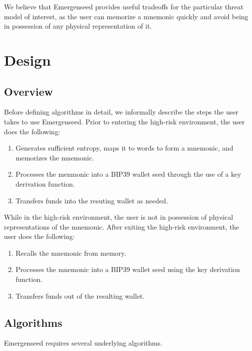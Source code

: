 \documentclass{article}
\begin{document}
We believe that Emergenseed provides useful tradeoffs for the particular threat model of interest, as the user can memorize a mnemonic quickly and avoid being in possession of any physical representation of it.


\section{Design}

\subsection{Overview}

Before defining algorithms in detail, we informally describe the steps the user takes to use Emergenseed.
Prior to entering the high-risk environment, the user does the following:
\begin{enumerate}
	\item Generates sufficient entropy, maps it to words to form a mnemonic, and memorizes the mnemonic.
	\item Processes the menmonic into a BIP39 wallet seed through the use of a key derivation function.
	\item Transfers funds into the resuting wallet as needed.
\end{enumerate}
While in the high-risk environment, the user is not in possession of physical representations of the mnemonic.
After exiting the high-risk environment, the user does the following:
\begin{enumerate}
	\item Recalls the mnemonic from memory.
	\item Processes the mnemonic into a BIP39 wallet seed using the key derivation function.
	\item Transfers funds out of the resulting wallet.
\end{enumerate}


\subsection{Algorithms}

Emergenseed requires several underlying algorithms.
\end{document}
